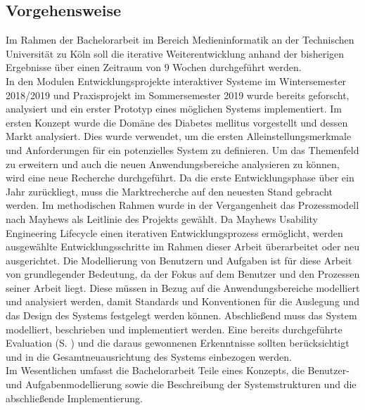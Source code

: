 \subsection{Vorgehensweise}
	Im Rahmen der Bachelorarbeit im Bereich Medieninformatik an der Technischen Universität zu Köln soll die iterative Weiterentwicklung anhand der bisherigen Ergebnisse über einen Zeitraum von 9 Wochen durchgeführt werden.\\
	In den Modulen \glqq Entwicklungsprojekte interaktiver Systeme\grqq{} im Wintersemester 2018/2019 und \glqq Praxisprojekt\grqq{} im Sommersemester 2019 wurde bereits geforscht, analysiert und ein erster Prototyp eines möglichen Systems implementiert. Im ersten Konzept wurde die Domäne des Diabetes mellitus vorgestellt und dessen Markt analysiert. Dies wurde verwendet, um die ersten Alleinstellungsmerkmale und Anforderungen für ein potenzielles System zu definieren. Um das Themenfeld zu erweitern und auch die neuen Anwendungsbereiche analysieren zu können, wird eine neue Recherche durchgeführt. Da die erste Entwicklungsphase über ein Jahr zurückliegt, muss die Marktrecherche auf den neuesten Stand gebracht werden. Im methodischen Rahmen wurde in der Vergangenheit das Prozessmodell nach Mayhews als Leitlinie des Projekts gewählt. Da Mayhews Usability Engineering Lifecycle einen iterativen Entwicklungsprozess ermöglicht, werden ausgewählte Entwicklungsschritte im Rahmen dieser Arbeit überarbeitet oder neu ausgerichtet. Die Modellierung von Benutzern und Aufgaben ist für diese Arbeit von grundlegender Bedeutung, da der Fokus auf dem Benutzer und den Prozessen seiner Arbeit liegt. Diese müssen in Bezug auf die Anwendungsbereiche modelliert und analysiert werden, damit Standards und Konventionen für die Auslegung und das Design des Systems festgelegt werden können. Abschließend muss das System modelliert, beschrieben und implementiert werden. Eine bereits durchgeführte Evaluation (S. \pageref{section:Evaluation}) und die daraus gewonnenen Erkenntnisse sollten berücksichtigt und in die Gesamtneuausrichtung des Systems einbezogen werden.\\
	Im Wesentlichen umfasst die Bachelorarbeit Teile eines Konzepts, die Benutzer- und Aufgabenmodellierung sowie die Beschreibung der Systemstrukturen und die abschließende Implementierung. 

